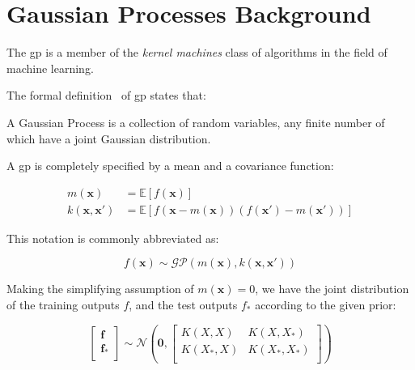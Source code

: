 \section{Gaussian Processes Background}\label{sec:gaussian_processes}

The \acrfull{gp} is a member of the \textit{kernel machines} class of algorithms
in the field of machine learning.

The formal definition~\cite{rasmussenGaussianProcessesMachine2006} of
\acrlong{gp} states that:


\begin{displayquote}
    A Gaussian Process is a collection of random variables, any finite number of
    which have a joint Gaussian distribution.
\end{displayquote}

A \acrshort{gp} is completely specified by a mean and a covariance function:

\begin{equation}
    \begin{aligned}
        m(\mathbf{x}) &= \mathbb{E}[f(\mathbf{x})] \\
        k(\mathbf{x}, \mathbf{x'}) &= \mathbb{E}[f(\mathbf{x} -
        m(\mathbf{x}))(f(\mathbf{x'}) - m(\mathbf{x'}))]
    \end{aligned}
\end{equation}

This notation is commonly abbreviated as:

\begin{equation}
    f(\mathbf{x}) \sim \mathcal{GP}(m(\mathbf{x}), k(\mathbf{x}, \mathbf{x'}))
\end{equation}

Making the simplifying assumption of $m(\mathbf{x}) = 0$, we have the joint
distribution of the training outputs $f$, and the test outputs $f_*$ according
to the given prior:

\begin{equation}
    \begin{bmatrix}
        \mathbf{f} \\
        \mathbf{f_*} \\
    \end{bmatrix} \sim
    \mathcal{N}\left(
        \mathbf{0}, 
        \begin{bmatrix}
            K(X, X) & K(X, X_*) \\
            K(X_*, X) & K(X_*, X_*) \\
        \end{bmatrix}
    \right)
\end{equation}

